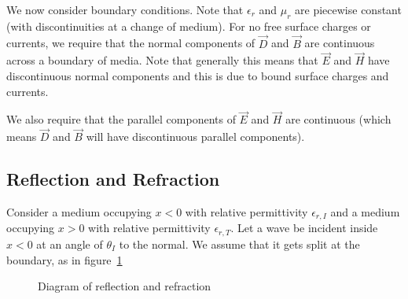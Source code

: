 \documentclass[../Main.tex]{subfiles}
\begin{document}
We now consider boundary conditions. Note that $\epsilon_r$ and $\mu_r$ are piecewise constant (with discontinuities at a change of medium). For no free surface charges or currents, we require that the normal components of $\vec D$ and $\vec B$ are continuous across a boundary of media. Note that generally this means that $\vec E$ and $\vec H$ have discontinuous normal components and this is due to bound surface charges and currents.

We also require that the parallel components of $\vec E$ and $\vec H$ are continuous (which means $\vec D$ and $\vec B$ will have discontinuous parallel components).
\subsection{Reflection and Refraction}
Consider a medium occupying $x < 0$ with relative permittivity $\epsilon_{r, I}$ and a medium occupying $x > 0$ with relative permittivity $\epsilon_{r, T}$. Let a wave be incident inside $x < 0$ at an angle of $\theta_I$ to the normal. We assume that it gets split at the boundary, as in figure~\ref{figReflectRefract}

\begin{figure}
    \centering
    \caption{Diagram of reflection and refraction}
    \label{figReflectRefract}
\end{figure}
\end{document}
